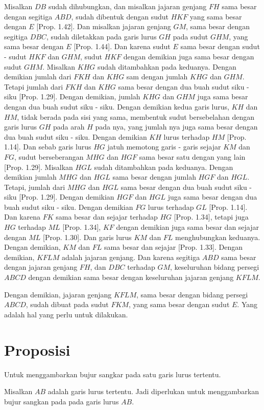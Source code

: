 \documentclass[a4paper]{book}
\begin{document}
Misalkan $DB$ sudah dihubungkan, dan misalkan jajaran genjang $FH$ sama 
besar dengan segitiga $ABD$, sudah dibentuk dengan sudut $HKF$ yang sama
besar dengan $E$ [Prop. 1.42]. Dan misalkan jajaran genjang $GM$, sama besar
dengan segitiga $DBC$, sudah diletakkan pada garis lurus $GH$ pada sudut
$GHM$, yang sama besar dengan $E$ [Prop. 1.44]. Dan karena sudut $E$ sama 
besar dengan sudut - sudut $HKF$ dan $GHM$, sudut $HKF$ dengan demikian
juga sama besar dengan sudut $GHM$. Misalkan $KHG$ sudah ditambahkan pada
keduanya. Dengan demikian jumlah dari $FKH$ dan $KHG$ sam dengan jumlah
$KHG$ dan $GHM$. Tetapi jumlah dari $FKH$ dan $KHG$ sama besar dengan dua
buah sudut siku - siku [Prop. 1.29]. Dengan demikian, jumlah $KHG$ dan $GHM$
juga sama besar dengan dua buah sudut siku - siku. Dengan demikian kedua 
garis lurus, $KH$ dan $HM$, tidak berada pada sisi yang sama, membentuk
sudut bersebelahan dengan garis lurus $GH$ pada arah $H$ pada nya, yang jumlah
nya juga sama besar dengan dua buah sudut siku - siku. Dengan demikian
$KH$ lurus terhadap $HM$ [Prop. 1.14]. Dan sebab garis lurus $HG$ jatuh
memotong garis - garis sejajar  $KM$ dan $FG$, sudut berseberangan $MHG$ dan
$HGF$ sama besar satu dengan yang lain [Prop. 1.29]. Misalkan $HGL$ sudah
ditambahkan pada keduanya. Dengan demikian jumlah $MHG$ dan $HGL$ sama besar
dengan jumlah $HGF$ dan $HGL$. Tetapi, jumlah dari $MHG$ dan $HGL$ sama
besar dengan dua buah sudut siku - siku [Prop. 1.29]. Dengan demikian
$HGF$ dan $HGL$ juga sama besar dengan dua buah sudut siku - siku. Dengan
demikian $FG$ lurus terhadap $GL$ [Prop. 1.14]. Dan karena $FK$ sama besar dan 
sejajar terhadap $HG$ [Prop. 1.34], tetapi juga $HG$ terhadap $ML$ 
[Prop. 1.34], $KF$ dengan demikian juga sama besar dan sejajar dengan
$ML$ [Prop. 1.30]. Dan garis lurus $KM$ dan $FL$ menghubungkan keduanya.
Dengan demikian, $KM$ dan $FL$ sama besar dan sejajar [Prop. 1.33]. 
Dengan demikian, $KFLM$ adalah jajaran genjang. Dan karena segitiga 
$ABD$ sama besar dengan jajaran genjang $FH$, dan $DBC$ terhadap
$GM$, keseluruhan bidang persegi $ABCD$ dengan demikian sama
besar dengan keseluruhan jajaran genjang $KFLM$.

Dengan demikian, jajaran genjang $KFLM$, sama besar dengan bidang
persegi $ABCD$, sudah dibuat pada sudut $FKM$, yang sama besar
dengan sudut $E$. Yang adalah hal yang perlu untuk dilakukan.

\section*{\centering Proposisi \thesection} 
Untuk menggambarkan bujur sangkar pada satu garis lurus tertentu.
\begin{center}
\end{center}
Misalkan $AB$ adalah garis lurus tertentu. Jadi diperlukan untuk menggambarkan
bujur sangkan pada pada garis lurus $AB$.
\end{document}
